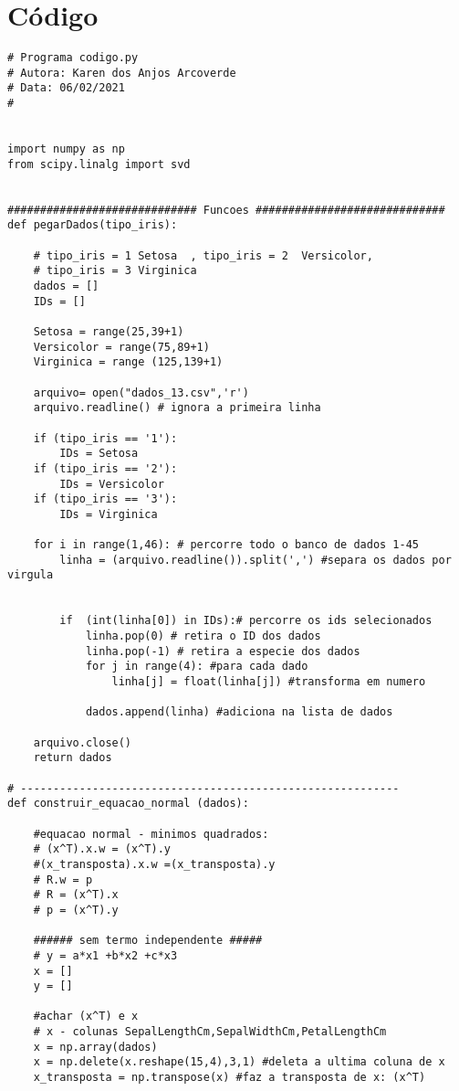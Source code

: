 \documentclass[a4paper,12pt,twoside]{article}
\begin{document}
\section{Código}
\begin{lstlisting}
# Programa codigo.py
# Autora: Karen dos Anjos Arcoverde
# Data: 06/02/2021
#


import numpy as np
from scipy.linalg import svd


############################# Funcoes #############################
def pegarDados(tipo_iris): 
    
    # tipo_iris = 1 Setosa  , tipo_iris = 2  Versicolor, 
    # tipo_iris = 3 Virginica
    dados = []
    IDs = []
    
    Setosa = range(25,39+1)
    Versicolor = range(75,89+1)
    Virginica = range (125,139+1)
    
    arquivo= open("dados_13.csv",'r')
    arquivo.readline() # ignora a primeira linha
    
    if (tipo_iris == '1'):
        IDs = Setosa
    if (tipo_iris == '2'):
        IDs = Versicolor
    if (tipo_iris == '3'):
        IDs = Virginica
        
    for i in range(1,46): # percorre todo o banco de dados 1-45
        linha = (arquivo.readline()).split(',') #separa os dados por virgula
    
        
        if  (int(linha[0]) in IDs):# percorre os ids selecionados
            linha.pop(0) # retira o ID dos dados
            linha.pop(-1) # retira a especie dos dados
            for j in range(4): #para cada dado 
                linha[j] = float(linha[j]) #transforma em numero
                
            dados.append(linha) #adiciona na lista de dados
            
    arquivo.close()
    return dados

# ----------------------------------------------------------
def construir_equacao_normal (dados):
    
    #equacao normal - minimos quadrados:
    # (x^T).x.w = (x^T).y
    #(x_transposta).x.w =(x_transposta).y
    # R.w = p
    # R = (x^T).x
    # p = (x^T).y
    
    ###### sem termo independente #####
    # y = a*x1 +b*x2 +c*x3
    x = []
    y = []
    
    #achar (x^T) e x
    # x - colunas SepalLengthCm,SepalWidthCm,PetalLengthCm
    x = np.array(dados) 
    x = np.delete(x.reshape(15,4),3,1) #deleta a ultima coluna de x
    x_transposta = np.transpose(x) #faz a transposta de x: (x^T)
    

\end{lstlisting}
\end{document}
